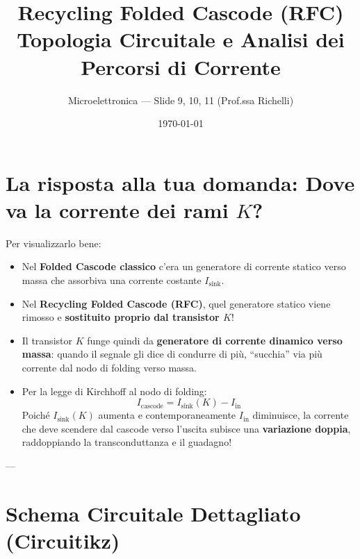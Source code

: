 \documentclass[11pt,a4paper]{article}
\title{\textbf{\LARGE Recycling Folded Cascode (RFC)}\\\Large Topologia Circuitale e Analisi dei Percorsi di Corrente}
\author{Microelettronica --- Slide 9, 10, 11 (Prof.ssa Richelli)}
\date{\today}
\begin{document}
\maketitle

\section{La risposta alla tua domanda: Dove va la corrente dei rami $K$?}

\begin{center}
\end{center}

\vspace{0.3cm}
\noindent Per visualizzarlo bene:
\begin{itemize}
    \item Nel \textbf{Folded Cascode classico} c'era un generatore di corrente statico verso massa che assorbiva una corrente costante $I_{\text{sink}}$.
    \item Nel \textbf{Recycling Folded Cascode (RFC)}, quel generatore statico viene rimosso e \textbf{sostituito proprio dal transistor $K$}!
    \item Il transistor $K$ funge quindi da \textbf{generatore di corrente dinamico verso massa}: quando il segnale gli dice di condurre di più, ``succhia'' via più corrente dal nodo di folding verso massa.
    \item Per la legge di Kirchhoff al nodo di folding:
    \begin{equation}
        I_{\text{cascode}} = I_{\text{sink}}(K) - I_{\text{in}}
    \end{equation}
    Poiché $I_{\text{sink}}(K)$ aumenta e contemporaneamente $I_{\text{in}}$ diminuisce, la corrente che deve scendere dal cascode verso l'uscita subisce una \textbf{variazione doppia}, raddoppiando la transconduttanza e il guadagno!
\end{itemize}

---

\newpage
\section{Schema Circuitale Dettagliato (Circuitikz)}
\end{document}
